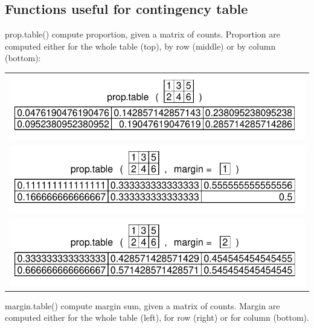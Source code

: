 \documentclass[pdflatex]{article}
\begin{document}
\subsection{Functions useful for contingency table}

prop.table() compute proportion, given a matrix of counts. Proportion are computed either for the whole table (top), by row (middle) or by column (bottom):

\begin{tabular}{c}
\includegraphics{prop_table1}\\
\includegraphics{prop_table_row}\\
\includegraphics{prop_table_column}
\end{tabular}

margin.table() compute margin sum, given a matrix of counts. Margin are
computed either for the whole table (left), for row (right) or for column
(bottom).
\end{document}
